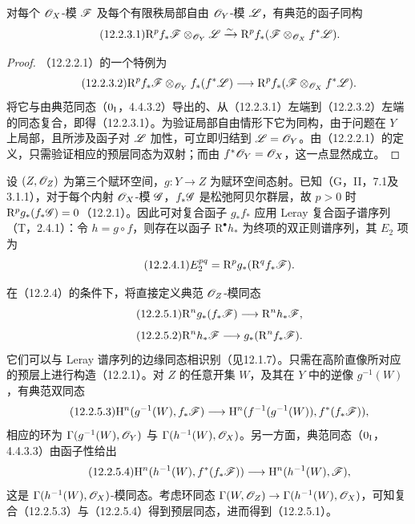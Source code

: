 对每个 $\mathscr O_X$-模 $\mathscr F$ 及每个有限秩局部自由 $\mathscr O_Y$-模 $\mathscr L$，有典范的函子同构
\begin{equation}\tag{12.2.3.1}
\mathrm R^pf_*\mathscr F\otimes_{\mathscr O_Y}\mathscr L
\xrightarrow{\sim}\mathrm R^pf_*(\mathscr F\otimes_{\mathscr O_X}f^*\mathscr L).
\end{equation}
\begin{proof}
（12.2.2.1）的一个特例为
\begin{equation}\tag{12.2.3.2}
\mathrm R^pf_*\mathscr F\otimes_{\mathscr O_Y}f_*(f^*\mathscr L)
\longrightarrow\mathrm R^pf_*(\mathscr F\otimes_{\mathscr O_X}f^*\mathscr L).
\end{equation}
将它与由典范同态（$0_{\mathrm I}$，4.4.3.2）导出的、从（12.2.3.1）左端到（12.2.3.2）左端的同态复合，即得（12.2.3.1）。为验证局部自由情形下它为同构，由于问题在 $Y$ 上局部，且所涉及函子对 $\mathscr L$ 加性，可立即归结到 $\mathscr L=\mathscr O_Y$。由（12.2.2.1）的定义，只需验证相应的预层同态为双射；而由 $f^*\mathscr O_Y=\mathscr O_X$，这一点显然成立。
\end{proof}

设 $(Z,\mathscr O_Z)$ 为第三个赋环空间，$g:Y\to Z$ 为赋环空间态射。已知（G，II，7.1及3.1.1），对于每个内射 $\mathscr O_X$-模 $\mathscr G$，$f_*\mathscr G$ 是松弛阿贝尔群层，故 $p>0$ 时 $\mathrm R^pg_*(f_*\mathscr G)=0$（12.2.1）。因此可对复合函子 $g_*f_*$ 应用 Leray 复合函子谱序列（T，2.4.1）：令 $h=g\circ f$，则存在以函子 $\mathrm R^\bullet h_*$ 为终项的双正则谱序列，其 $E_2$ 项为
\begin{equation}\tag{12.2.4.1}
E_2^{pq}=\mathrm R^pg_*(\mathrm R^qf_*\mathscr F).
\end{equation}

在（12.2.4）的条件下，将直接定义典范 $\mathscr O_Z$-模同态
\begin{equation}\tag{12.2.5.1}
\mathrm R^ng_*(f_*\mathscr F)\longrightarrow\mathrm R^nh_*\mathscr F,
\end{equation}
\begin{equation}\tag{12.2.5.2}
\mathrm R^nh_*\mathscr F\longrightarrow g_*(\mathrm R^nf_*\mathscr F).
\end{equation}
它们可以与 Leray 谱序列的边缘同态相识别（见12.1.7）。只需在高阶直像所对应的预层上进行构造（12.2.1）。对 $Z$ 的任意开集 $W$，及其在 $Y$ 中的逆像 $g^{-1}(W)$，有典范双同态
\begin{equation}\tag{12.2.5.3}
\mathrm H^n(g^{-1}(W),f_*\mathscr F)
\longrightarrow\mathrm H^n(f^{-1}(g^{-1}(W)),f^*(f_*\mathscr F)),
\end{equation}
相应的环为 $\Gamma(g^{-1}(W),\mathscr O_Y)$ 与 $\Gamma(h^{-1}(W),\mathscr O_X)$。另一方面，典范同态（$0_{\mathrm I}$，4.4.3.3）由函子性给出
\begin{equation}\tag{12.2.5.4}
\mathrm H^n(h^{-1}(W),f^*(f_*\mathscr F))\longrightarrow\mathrm H^n(h^{-1}(W),\mathscr F),
\end{equation}
这是 $\Gamma(h^{-1}(W),\mathscr O_X)$-模同态。考虑环同态 $\Gamma(W,\mathscr O_Z)\to\Gamma(h^{-1}(W),\mathscr O_X)$，可知复合（12.2.5.3）与（12.2.5.4）得到预层同态，进而得到（12.2.5.1）。


